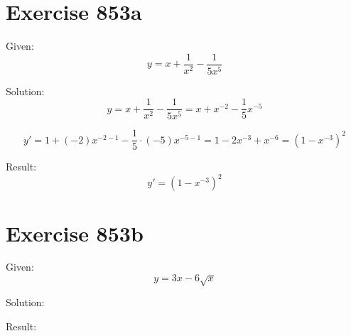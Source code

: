 \documentclass[a4paper, 10pt]{scrartcl}
\begin{document}
\section{Exercise 853a}

Given:
\[
y = x + \frac{1}{x^{2}} - \frac{1}{5x^{5}}
\]

Solution:
\[
y = x + \frac{1}{x^{2}} - \frac{1}{5x^{5}} = x + x^{-2} - \frac{1}{5}x^{-5}
\]

\[
y' = 1 + (-2)x^{-2 - 1} - \frac{1}{5}\cdot(-5)x^{-5 - 1} = 1 - 2x^{-3} + x^{-6} = (1 - x^{-3})^{2}
\]

Result:
\[
y' = (1 - x^{-3})^{2}
\]

\section{Exercise 853b}

Given:
\[
y = 3x - 6\sqrt{x}
\]

Solution:

Result:
\end{document}
